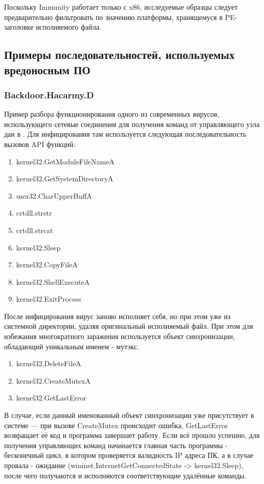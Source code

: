 Поскольку Immunity работает только с x86, исследуемые образцы следует предварительно фильтровать по значению платформы, хранящемуся в PE-заголовке исполняемого файла.
\subsection {Примеры последовательностей, используемых вредоносным ПО}
\subsubsection {Backdoor.Hacarmy.D}
Пример разбора функционирования одного из современных вирусов, использующего сетевые соединения для
получения команд от управляющего узла дан в \cite{REVERSING}. Для инфицирования там используется следующая последовательность вызовов API функций:
\begin {enumerate}
	\item kernel32.GetModuleFileNameA
	\item kernel32.GetSystemDirectoryA
	\item user32.CharUpperBuffA
	\item crtdll.strstr
	\item crtdll.strcat
	\item kernel32.Sleep
	\item kernel32.CopyFileA
	\item kernel32.ShellExecuteA
	\item kernel32.ExitProcess
\end {enumerate}
После инфицирования вирус заново исполняет себя, но при этом уже из системной директории, удаляя оригинальный исполняемый файл. При этом для избежания многократного заражения используется объект синхронизации, обладающий уникальным именем - мутэкс.
\begin {enumerate}
	\item kernel32.DeleteFileA
	\item kernel32.CreateMutexA
	\item kernel32.GetLastError
\end {enumerate}
В случае, если данный именованный объект синхронизации уже присутствует в системе --- при вызове CreateMutex происходит ошибка, GetLastError возвращает её код и программа завершает работу. Если всё прошло успешно, для получения управляющих команд начинается главная часть программы - бесконечный цикл, в котором проверяется валидность IP адреса ПК, а в случае провала - ожидание (wininet.InternetGetConnectedState -> kernel32.Sleep), после чего получаются и исполняются соответствующие удалённые команды.
